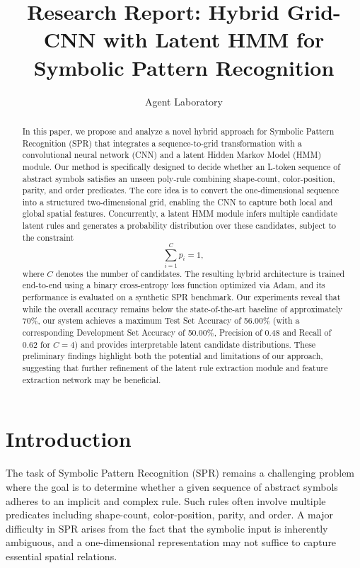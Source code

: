 \documentclass[11pt]{article}
\title{Research Report: Hybrid Grid-CNN with Latent HMM for Symbolic Pattern Recognition}
\author{Agent Laboratory}
\date{}
\begin{document}
\maketitle

\begin{abstract}
In this paper, we propose and analyze a novel hybrid approach for Symbolic Pattern Recognition (SPR) that integrates a sequence-to-grid transformation with a convolutional neural network (CNN) and a latent Hidden Markov Model (HMM) module. Our method is specifically designed to decide whether an L-token sequence of abstract symbols satisfies an unseen poly‐rule combining shape-count, color-position, parity, and order predicates. The core idea is to convert the one-dimensional sequence into a structured two-dimensional grid, enabling the CNN to capture both local and global spatial features. Concurrently, a latent HMM module infers multiple candidate latent rules and generates a probability distribution over these candidates, subject to the constraint 
\[
\sum_{i=1}^{C} p_i = 1,
\]
where \(C\) denotes the number of candidates. The resulting hybrid architecture is trained end-to-end using a binary cross-entropy loss function optimized via Adam, and its performance is evaluated on a synthetic SPR benchmark. Our experiments reveal that while the overall accuracy remains below the state-of-the-art baseline of approximately 70\%, our system achieves a maximum Test Set Accuracy of 56.00\% (with a corresponding Development Set Accuracy of 50.00\%, Precision of 0.48 and Recall of 0.62 for \(C=4\)) and provides interpretable latent candidate distributions. These preliminary findings highlight both the potential and limitations of our approach, suggesting that further refinement of the latent rule extraction module and feature extraction network may be beneficial.
\end{abstract}

\section{Introduction}
The task of Symbolic Pattern Recognition (SPR) remains a challenging problem where the goal is to determine whether a given sequence of abstract symbols adheres to an implicit and complex rule. Such rules often involve multiple predicates including shape-count, color-position, parity, and order. A major difficulty in SPR arises from the fact that the symbolic input is inherently ambiguous, and a one-dimensional representation may not suffice to capture essential spatial relations.
\end{document}
